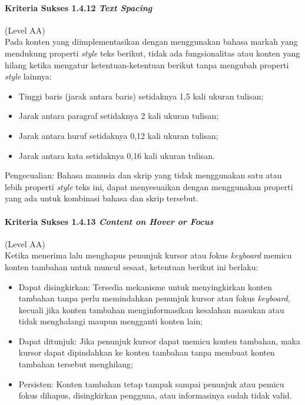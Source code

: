 \paragraph{Kriteria Sukses 1.4.12 \textit{Text Spacing}}
\label{sec:kriteria_sukses_1.4.12}
(Level AA)\\

Pada konten yang diimplementasikan dengan menggunakan bahasa markah yang mendukung properti \textit{style} teks berikut, tidak ada fungsionalitas atau konten yang hilang ketika mengatur ketentuan-ketentuan berikut tanpa mengubah properti \textit{style} lainnya:

\begin{itemize}
	\item Tinggi baris (jarak antara baris) setidaknya 1,5 kali ukuran tulisan;
	\item Jarak antara paragraf setidaknya 2 kali ukuran tulisan;
	\item Jarak antara huruf setidaknya 0,12 kali ukuran tulisan;
	\item Jarak antara kata setidaknya 0,16 kali ukuran tulisan.
\end{itemize}

Pengecualian: Bahasa manusia dan skrip yang tidak menggunakan satu atau lebih properti \textit{style} teks ini, dapat menyesuaikan dengan menggunakan properti yang ada untuk kombinasi bahasa dan skrip tersebut.

\paragraph{Kriteria Sukses 1.4.13 \textit{Content on Hover or Focus}}
\label{sec:kriteria_sukses_1.4.13}
(Level AA)\\

Ketika menerima lalu menghapus penunjuk kursor atau fokus \textit{keyboard} memicu konten tambahan untuk muncul sesaat, ketentuan berikut ini berlaku:

\begin{itemize}
	\item Dapat disingkirkan: Tersedia mekanisme untuk menyingkirkan konten tambahan tanpa perlu memindahkan penunjuk kursor atau fokus \textit{keyboard}, kecuali jika konten tambahan menginformasikan kesalahan masukan atau tidak menghalangi maupun mengganti konten lain;
	\item Dapat ditunjuk: Jika penunjuk kursor dapat memicu konten tambahan, maka kursor dapat dipindahkan ke konten tambahan tanpa membuat konten tambahan tersebut menghilang;
	\item Persisten: Konten tambahan tetap tampak sampai penunjuk atau pemicu fokus dihapus, disingkirkan pengguna, atau informasinya sudah tidak valid.
\end{itemize}

